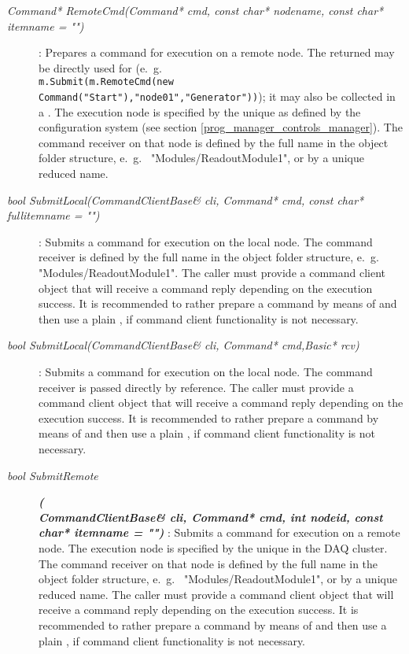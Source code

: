 \begin{description}
\item[\em Command* RemoteCmd\small (Command* cmd, const char* nodename, 
const char* itemname = "")]:
Prepares a command  for execution on a remote node. 
The returned  may be directly used for 
(e.~g.~ \\{\tt m.Submit(m.RemoteCmd(new Command("Start"),"node01","Generator"))});
it may also be collected in a .
The execution node is specified by the unique  as defined
by the configuration system (see section \ref{prog_manager_controls_manager}).
The command receiver on that node
is defined by the full name  in the object folder structure,
e.~g.~ "Modules/ReadoutModule1", or by a unique reduced name.



\item[\em bool SubmitLocal\small (CommandClientBase\& cli, Command* cmd, const char* fullitemname = "")] :
Submits a command  for execution on the local node. The command receiver
is defined by the full name  in the object folder structure,
e.~g.~ "Modules/ReadoutModule1". The caller must provide a command client object
 that will receive a command reply depending on the execution success.
It is recommended to rather prepare a command by means of  
and then use a  plain , if command client functionality
is not necessary.





\item[\em bool SubmitLocal\small (CommandClientBase\& cli, Command* cmd,Basic* rcv)] :
Submits a command  for execution on the local node. The command receiver
 is passed directly by reference.
The caller must provide a command client object
 that will receive a command reply depending on the execution success.
It is recommended to rather prepare a command by means of  
and then use a  plain , if command client functionality
is not necessary.

\item[\em bool SubmitRemote ] {\small \bf\em (} \\
{\small \bf\em CommandClientBase\& cli, Command* cmd, int nodeid, const char* itemname = "") } :
Submits a command  for execution on a remote node. 
The execution node is specified by the unique  in the DAQ
cluster. The command receiver on that node
is defined by the full name  in the object folder structure,
e.~g.~ "Modules/ReadoutModule1", or by a unique reduced name.  
The caller must provide a command client object
 that will receive a command reply depending on the execution success.
It is recommended to rather prepare a command by means of  
and then use a  plain , if command client functionality
is not necessary.


\end{description}

